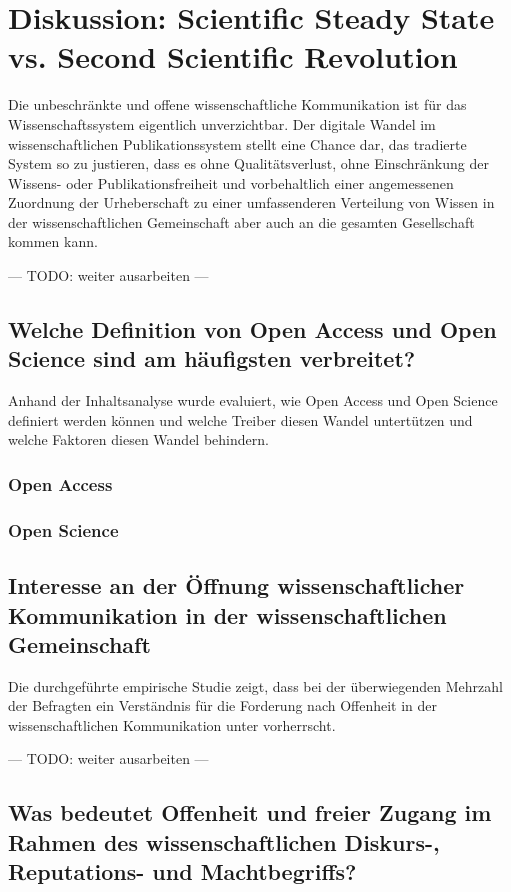 \chapter{Diskussion: Scientific Steady State vs. Second Scientific Revolution}

Die unbeschränkte und offene wissenschaftliche Kommunikation ist für das Wissenschaftssystem eigentlich unverzichtbar. Der digitale Wandel im wissenschaftlichen Publikationssystem stellt eine Chance dar, das tradierte System so zu justieren, dass es ohne Qualitätsverlust, ohne Einschränkung der Wissens- oder Publikationsfreiheit und vorbehaltlich einer angemessenen Zuordnung der Urheberschaft zu einer umfassenderen Verteilung von Wissen in der wissenschaftlichen Gemeinschaft aber auch an die gesamten Gesellschaft kommen kann.

--- TODO: weiter ausarbeiten ---

\section{Welche Definition von Open Access und Open Science sind am häufigsten verbreitet?}

Anhand der Inhaltsanalyse wurde evaluiert, wie Open Access und Open Science definiert werden können und welche Treiber diesen Wandel untertützen und welche Faktoren diesen Wandel behindern.

\subsection{Open Access}

\subsection{Open Science}

\section{Interesse an der Öffnung wissenschaftlicher Kommunikation in der wissenschaftlichen Gemeinschaft}

Die durchgeführte empirische Studie zeigt, dass bei der überwiegenden Mehrzahl der Befragten ein Verständnis für die Forderung nach Offenheit in der wissenschaftlichen Kommunikation unter vorherrscht.

--- TODO: weiter ausarbeiten ---

\section{Was bedeutet Offenheit und freier Zugang im Rahmen des wissenschaftlichen Diskurs-, Reputations- und Machtbegriffs?}

